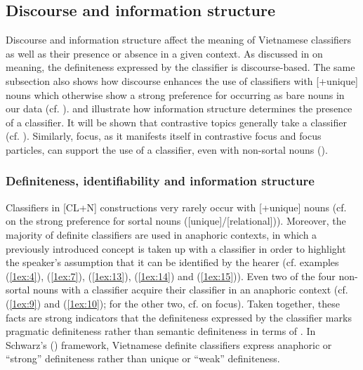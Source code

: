 \documentclass[output=paper]{langsci/langscibook}
\begin{document}
\subsection{Discourse and information structure}\label{1sec:34}
Discourse and information structure affect the meaning of Vietnamese classifiers as well as their presence or absence in a given context. As discussed in  on meaning, the definiteness expressed by the classifier is discourse-based. The same subsection also shows how discourse enhances the use of classifiers with [+unique] nouns which otherwise show a strong preference for occurring as bare nouns in our data (cf. ).  and  illustrate how information structure determines the presence of a classifier. It will be shown that contrastive topics generally take a classifier (cf. ). Similarly, focus, as it manifests itself in contrastive focus and focus particles, can support the use of a classifier, even with non-sortal nouns ().


\subsubsection{Definiteness, identifiability and information structure}\label{1sec:341}
Classifiers in [CL+N] constructions  very rarely  occur  with [+unique] nouns (cf.  on the strong preference for sortal nouns ([\minus unique]/[\minus relation\-al])). Moreover, the majority of definite classifiers are used in anaphoric contexts, in which a previously introduced concept is taken up with a classifier in order to highlight the speaker's assumption that it can be identified by the hearer (cf. examples (\ref{1ex:4}), (\ref{1ex:7}), (\ref{1ex:13}), (\ref{1ex:14}) and (\ref{1ex:15})). Even two of the four non-sortal nouns with a classifier acquire their classifier in an anaphoric context (cf. (\ref{1ex:9}) and (\ref{1ex:10}); for the other two, cf.  on focus). Taken together, these facts are strong indicators that the definiteness expressed by the classifier marks pragmatic definiteness rather than semantic definiteness in terms of \cite{lobner:85}. In Schwarz's (\citeyear{schwarz:09,schwarz:13}) framework, Vietnamese definite classifiers express anaphoric or ``strong'' definiteness rather than unique or ``weak'' definiteness.
\end{document}
